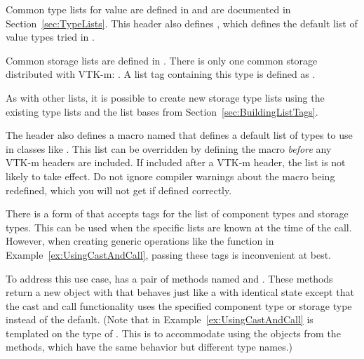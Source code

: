 Common type lists for value are defined in
 and are documented in
Section~\ref{sec:TypeLists}. This header also defines
, which defines the default list
of value types tried in .


Common storage lists are defined in
. There is only one common storage
distributed with VTK-m: . A list tag
containing this type is defined as .

As with other lists, it is possible to create new storage type lists
using the existing type lists and the list bases from
Section~\ref{sec:BuildingListTags}.

The  header also defines a macro
named  that defines a
default list of types to use in classes like
. This list can be overridden by
defining the  macro
\emph{before} any VTK-m headers are included. If included after a VTK-m
header, the list is not likely to take effect. Do not ignore compiler
warnings about the macro being redefined, which you will not get if defined
correctly.


There is a form of  that accepts tags for the list of
component types and storage types. This can be used when the specific
lists are known at the time of the call. However, when creating generic
operations like the  function in
Example~\ref{ex:UsingCastAndCall}, passing these tags is inconvenient at
best.

To address this use case,  has a pair of
methods named  and
. These methods return a new object with that
behaves just like a  with identical
state except that the cast and call functionality uses the specified
component type or storage type instead of the default. (Note that
 in Example~\ref{ex:UsingCastAndCall} is
templated on the type of . This is to
accommodate using the objects from the  methods, which
have the same behavior but different type names.)

